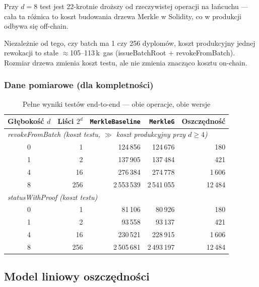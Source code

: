 \documentclass[11pt,a4paper]{article}
\begin{document}
\noindent Przy $d=8$ test jest 22-krotnie droższy od rzeczywistej operacji
na łańcuchu --- cała ta różnica to koszt budowania drzewa Merkle w Solidity,
co w produkcji odbywa się off-chain.

\begin{tcolorbox}[colback=blue!5!white,colframe=blue!50!black,title=Wniosek praktyczny]
Niezależnie od tego, czy batch ma 1 czy 256 dyplomów,
koszt produkcyjny jednej rewokacji to stałe $\approx$105--113\,k~gas
(issueBatchRoot + revokeFromBatch). Rozmiar drzewa zmienia
koszt testu, ale nie zmienia znacząco kosztu on-chain.
\end{tcolorbox}

\subsubsection*{Dane pomiarowe (dla kompletności)}

\begin{table}[H]
\centering
\caption{Pełne wyniki testów end-to-end --- obie operacje, obie wersje}
\begin{tabular}{crrrr}
\toprule
Głębokość \(d\) & Liści \(2^d\) & \texttt{MerkleBaseline} & \texttt{MerkleG} & Oszczędność \\
\midrule
\multicolumn{5}{l}{\itshape revokeFromBatch (koszt testu, $\gg$ koszt produkcyjny przy $d \geq 4$)} \\
\midrule
0 & 1   & 124\,856    & 124\,676    & 180 \\
1 & 2   & 137\,905    & 137\,484    & 421 \\
4 & 16  & 276\,384    & 274\,778    & 1\,606 \\
8 & 256 & 2\,553\,539 & 2\,541\,055 & 12\,484 \\
\midrule
\multicolumn{5}{l}{\itshape statusWithProof (koszt testu)} \\
\midrule
0 & 1   & 81\,106     & 80\,926     & 180 \\
1 & 2   & 93\,558     & 93\,137     & 421 \\
4 & 16  & 230\,521    & 228\,915    & 1\,606 \\
8 & 256 & 2\,505\,681 & 2\,493\,197 & 12\,484 \\
\bottomrule
\end{tabular}
\end{table}

\subsection{Model liniowy oszczędności}
\end{document}
